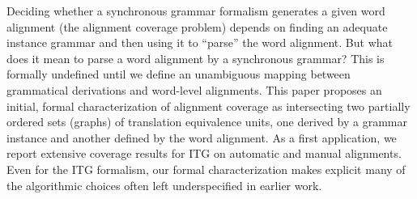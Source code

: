Deciding whether a synchronous grammar formalism generates a given word alignment
 (the alignment coverage problem) depends on
 finding an adequate instance grammar and
 then using it to ``parse'' the word alignment.
 But what does it mean to parse a word alignment
 by a synchronous grammar? This is formally
 undefined until we define an unambiguous
 mapping between grammatical derivations
 and word-level alignments. This paper
 proposes an initial, formal characterization
 of alignment coverage as intersecting two
 partially ordered sets (graphs) of translation
 equivalence units, one derived by a grammar
 instance and another defined by the word
 alignment. As a first application, we report extensive
 coverage results for ITG on automatic
 and manual alignments. Even for the ITG formalism,
 our formal characterization makes explicit
 many of the algorithmic choices often left underspecified
 in earlier work.

